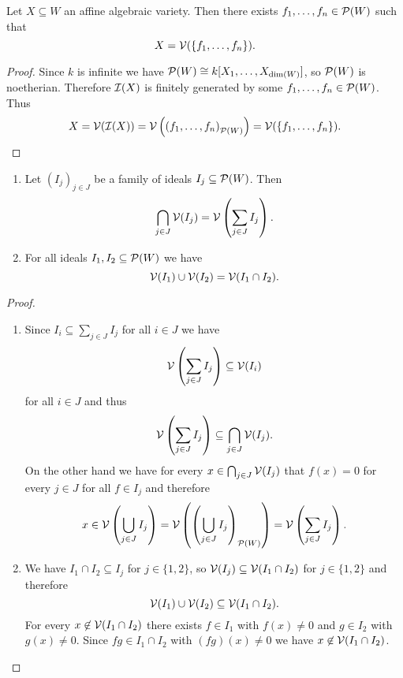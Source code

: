 \begin{cor}
  Let $X \subseteq W$ an affine algebraic variety.
  Then there exists $f_1, \dotsc, f_n \in \mathcal{P}(W)$ such that
  \[
      X
    = \mathcal{V}( \{f_1, \dotsc, f_n\} ).
  \]
\end{cor}
\begin{proof}
  Since $k$ is infinite we have $\mathcal{P}(W) \cong k[X_1, \dotsc, X_{\dim(W)}]$, so $\mathcal{P}(W)$ is noetherian.
  Therefore $\mathcal{I}(X)$ is finitely generated by some $f_1, \dotsc, f_n \in \mathcal{P}(W)$.
  Thus
  \[
      X
    = \mathcal{V}( \mathcal{I}(X) )
    = \mathcal{V}\left( \left( f_1, \dotsc, f_n \right)_{\mathcal{P}(W)} \right)
    = \mathcal{V}( \{f_1, \dotsc, f_n\} ).
    \qedhere
  \]
\end{proof}


\begin{prop}
  \begin{enumerate}[label=\emph{\alph*)},leftmargin=*]
    \item
      Let $(I_j)_{j \in J}$ be a family of ideals $I_j \subseteq \mathcal{P}(W)$. Then
      \[
          \bigcap_{j \in J} \mathcal{V}(I_j)
        = \mathcal{V}\left( \sum_{j \in J} I_j \right).
      \]
    \item
      For all ideals $I_1, I_2 \subseteq \mathcal{P}(W)$ we have
      \[
          \mathcal{V}(I_1) \cup \mathcal{V}(I_2)
        = \mathcal{V}(I_1 \cap I_2).
      \]
  \end{enumerate}
\end{prop}
\begin{proof}
  \begin{enumerate}[label=\emph{\alph*)},leftmargin=*]
    \item
      Since $I_i \subseteq \sum_{j \in J} I_j$ for all $i \in J$ we have
      \[
                  \mathcal{V}\left( \sum_{j \in J} I_j \right)
        \subseteq \mathcal{V}(I_i)
      \]
      for all $i \in J$ and thus
      \[
                  \mathcal{V}\left( \sum_{j \in J} I_j \right)
        \subseteq \bigcap_{j \in J} \mathcal{V}(I_j).
      \]
      On the other hand we have for every $x \in \bigcap_{j \in J} \mathcal{V}(I_j)$ that $f(x) = 0$ for every $j \in J$ for all $f \in I_j$ and therefore
      \[
            x
        \in \mathcal{V}\left( \bigcup_{j \in J} I_j \right)
        =   \mathcal{V}\left( \left( \bigcup_{j \in J} I_j \right)_{\mathcal{P}(W)} \right)
        =   \mathcal{V}\left( \sum_{j \in J} I_j \right).
      \]
    \item
      We have $I_1 \cap I_2 \subseteq I_j$ for $j \in \{1,2\}$, so $\mathcal{V}(I_j) \subseteq \mathcal{V}(I_1 \cap I_2)$ for $j \in \{1,2\}$ and therefore
      \[
                  \mathcal{V}(I_1) \cup \mathcal{V}(I_2)
        \subseteq \mathcal{V}(I_1 \cap I_2).
      \]
      For every $x \not\in \mathcal{V}(I_1 \cap I_2)$ there exists $f \in I_1$ with $f(x) \neq 0$ and $g \in I_2$ with $g(x) \neq 0$.
      Since $fg \in I_1 \cap I_2$ with $(fg)(x) \neq 0$ we have $x \not\in \mathcal{V}(I_1 \cap I_2)$.
    \qedhere
  \end{enumerate}
\end{proof}


